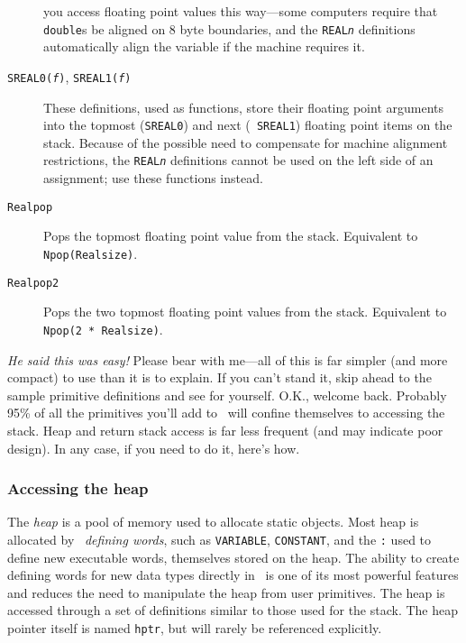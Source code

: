 \documentclass[twocolumn]{article}
\begin{document}
\begin{description}
                                you access floating point values this
                                way---some computers require that {\tt
                                double}s be aligned on 8 byte
                                boundaries, and the {\tt REAL{\em n}}
                                definitions automatically align the
                                variable if the machine requires it.
\item[{\tt SREAL0({\em f})}, {\tt SREAL1({\em f})}] These definitions,
                                used as functions, store their
                                floating point arguments into the
                                topmost ({\tt SREAL0}) and next ({\tt
                                SREAL1}) floating point items on the
                                stack.  Because of the possible need
                                to compensate for machine alignment
                                restrictions, the {\tt REAL{\em n}}
                                definitions cannot be used on the left
                                side of an assignment; use these
                                functions instead.
\item[{\tt Realpop}]            Pops the topmost floating point value
                                from the stack.  Equivalent to {\tt
                                Npop(Realsize)}.
\item[{\tt Realpop2}]           Pops the two topmost floating point
                                values
                                from the stack.  Equivalent to {\tt
                                Npop(2 * Realsize)}.
\end{description}

{\em He said this was easy!}  Please bear with me---all of this is
far simpler (and more compact) to use than it is to explain.  If you
can't stand it, skip ahead to the sample primitive definitions and see
for yourself.  O.K., welcome back.  Probably 95\% of all the
primitives you'll add to \atlast\ will confine themselves to accessing
the stack.  Heap and return stack access is far less frequent (and may
indicate poor design).  In any case, if you need to do it, here's
how.

\subsubsection{Accessing the heap}

The {\em heap} is a pool of memory used to allocate static
objects.  Most heap is allocated by \atlast\ {\em defining words}, such
as {\tt VARIABLE}, {\tt CONSTANT}, and the {\tt :} used to define new
executable words, themselves stored on the heap.  The ability to
create defining words for new data types directly in \atlast\ is one of
its most powerful features and reduces the need to manipulate the heap
from user primitives.  The heap is accessed through a set of
definitions similar to those used for the stack.  The heap pointer
itself is named {\tt hptr}, but will rarely be referenced explicitly.
\end{document}
